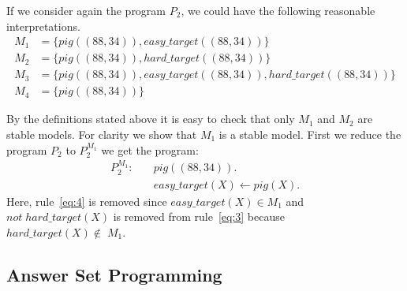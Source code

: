 
If we consider again the program \(P_2\), we could have the following reasonable interpretations.
\begin{align*}
M_1&= \{pig((88,34)), \mathit{easy\_target}((88,34))\}  \\
M_2&= \{pig((88,34)), \mathit{hard\_target}((88,34))\} \\
M_3&= \{pig((88,34)), \mathit{easy\_target}((88,34)), \mathit{hard\_target}((88,34))\} \\
M_4&= \{pig((88,34))\}
\end{align*}

By the definitions stated above it is easy to check that only \(M_1\) and \(M_2\) are stable models. For clarity we show that \(M_1\) is a stable model. First we reduce the program \(P_2\) to \(P_2^{M_1}\) we get the program:
\begin{align}
P_2^{M_1} \colon \quad
&pig((88,34)). \\
&\mathit{easy\_target}(X) \leftarrow pig(X). 
\end{align}
Here, rule~\eqref{eq:4} is removed since \(\mathit{easy\_target}(X) \in M_1\) and \(not\; \mathit{hard\_target}(X)\) is removed from rule~\eqref{eq:3} because \(\mathit{hard\_target}(X) \notin\; M_1\).
\subsection{Answer Set Programming}


